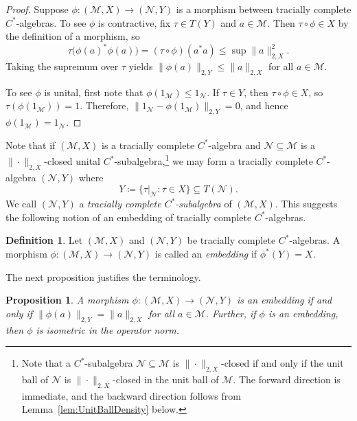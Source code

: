 \documentclass[a4paper,11pt]{amsart}
\newtheorem{proposition}[theorem]{Proposition}
\theoremstyle{definition}
\newtheorem{definition}[theorem]{Definition}
\numberwithin{equation}{section}
\numberwithin{theorem}{section}
\newcommand{\M}{\mathcal{M}}
\begin{document}
\begin{proof}
	Suppose $\phi \colon (\mathcal M, X) \rightarrow (\mathcal N, Y)$ is a morphism between tracially complete $C^*$-algebras.  To see $\phi$ is contractive, fix $\tau \in T(Y)$ and $a \in \mathcal M$. Then $\tau \circ \phi \in X$ by the definition of a morphism, so
	\begin{equation}
		\tau\big(\phi(a)^* \phi(a)\big) = (\tau \circ \phi)(a^*a) \leq \sup\|a\|^2_{2, X}.
	\end{equation}
	Taking the supremum over $\tau$ yields $\|\phi(a)\|_{2, Y} \leq \|a\|_{2, X}$ for all $a \in \mathcal M$.
	
	To see $\phi$ is unital, first note that $\phi(1_\M) \leq 1_{\mathcal{N}}$.
	If $\tau \in Y$, then $\tau \circ \phi \in X$, so $\tau(\phi(1_\mathcal M)) = 1$.  
	Therefore, $\big\| 1_\mathcal N - \phi(1_\mathcal M)\big\|_{2, Y} = 0$, and hence $\phi(1_\mathcal M) = 1_\mathcal N$.
\end{proof}

Note that if $(\M, X)$ is a tracially complete $C^*$-algebra and $\mathcal N \subseteq \mathcal{M}$ is a $\|\cdot\|_{2, X}$-closed unital $C^*$-subalgebra,\footnote{Note that a $C^*$-subalgebra $\mathcal N \subseteq \mathcal M$ is $\|\cdot\|_{2, X}$-closed if and only if the unit ball of $\mathcal N$ is $\|\cdot\|_{2, X}$-closed in the unit ball of $\mathcal M$.  The forward direction is immediate, and the backward direction follows from Lemma~\ref{lem:UnitBallDensity} below.} we may form a tracially complete $C^*$-algebra $(\mathcal N, Y)$ where
\begin{equation}
	Y \coloneqq \{ \tau|_{\mathcal N} : \tau \in X \} \subseteq T(\mathcal N).
\end{equation}
We call $(\mathcal N,Y)$ a \emph{tracially complete $C^*$-subalgebra} of $(\mathcal M,X)$. This suggests the following notion of an embedding of tracially complete $C^*$-algebras.

\begin{definition}\label{def:embedding}
	Let $(\M, X)$ and $(\mathcal N, Y)$ be tracially complete $C^*$-algebras.  A morphism $\phi \colon (\M, X) \rightarrow (\mathcal{N}, Y)$ is called an \emph{embedding} if $\phi^*(Y) = X$.
\end{definition}

The next proposition justifies the terminology.

\begin{proposition}\label{prop:embedding-isometric}
	A morphism $\phi \colon (\M, X) \rightarrow (\mathcal N, Y)$ is an embedding if and only if $\|\phi(a)\|_{2, Y} = \|a\|_{2, X}$ for all $a \in \M$.  Further, if $\phi$ is an embedding, then $\phi$ is isometric in the operator norm. 
\end{proposition}
\end{document}
